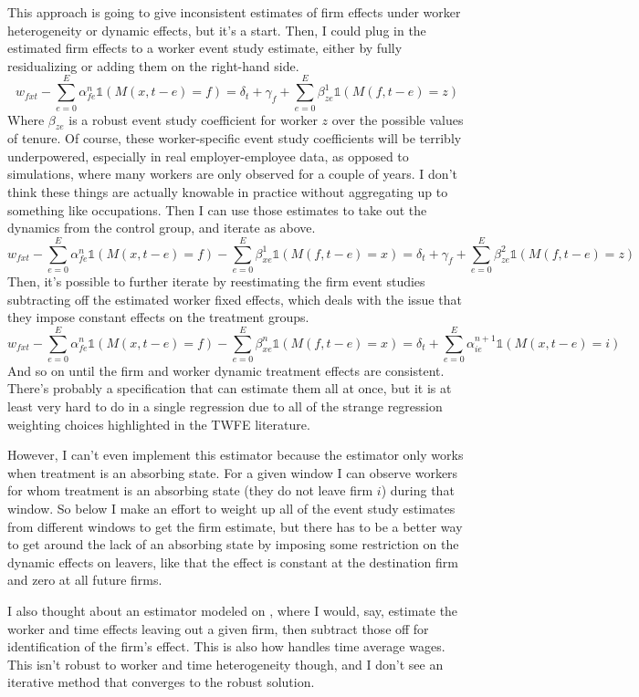 \documentclass{article}
\begin{document}
This approach is going to give inconsistent estimates of firm effects under worker heterogeneity or dynamic effects, but it's a start. Then, I could plug in the estimated firm effects to a worker event study estimate, either by fully residualizing or adding them on the right-hand side.
$$w_{fxt} - \sum_{e=0}^E \alpha^n_{fe} \mathbb{1} (M(x,t-e) = f) = \delta_t + \gamma_f + \sum_{e=0}^E \beta^1_{ze} \mathbb{1} (M(f,t-e) = z)$$
Where $\beta_{ze}$ is a robust event study coefficient for worker $z$ over the possible values of tenure. Of course, these worker-specific event study coefficients will be terribly underpowered, especially in real employer-employee data, as opposed to simulations, where many workers are only observed for a couple of years. I don't think these things are actually knowable in practice without aggregating up to something like occupations. Then I can use those estimates to take out the dynamics from the control group, and iterate as above.
$$w_{fxt} - \sum_{e=0}^E \alpha^n_{fe} \mathbb{1} (M(x,t-e) = f) - \sum_{e=0}^E \beta^1_{xe} \mathbb{1} (M(f,t-e) = x) = \delta_t + \gamma_f + \sum_{e=0}^E \beta^2_{ze} \mathbb{1} (M(f,t-e) = z)$$
Then, it's possible to further iterate by reestimating the firm event studies subtracting off the estimated worker fixed effects, which deals with the issue that they impose constant effects on the treatment groups.
$$w_{fxt} - \sum_{e=0}^E \alpha^n_{fe} \mathbb{1} (M(x,t-e) = f) - \sum_{e=0}^E \beta^n_{xe} \mathbb{1} (M(f,t-e) = x) = \delta_t + \sum_{e=0}^E \alpha^{n+1}_{ie} \mathbb{1} (M(x,t-e) = i)$$
And so on until the firm and worker dynamic treatment effects are consistent. There's probably a specification that can estimate them all at once, but it is at least very hard to do in a single regression due to all of the strange regression weighting choices highlighted in the TWFE literature.

However, I can't even implement this estimator because the \citet{sun2021estimating} estimator only works when treatment is an absorbing state. For a given window I can observe workers for whom treatment is an absorbing state (they do not leave firm $i$) during that window. So below I make an effort to weight up all of the event study estimates from different windows to get the firm estimate, but there has to be a better way to get around the lack of an absorbing state by imposing some restriction on the dynamic effects on leavers, like that the effect is constant at the destination firm and zero at all future firms.

I also thought about an estimator modeled on \citet{gardner2021two}, where I would, say, estimate the worker and time effects leaving out a given firm, then subtract those off for identification of the firm's effect. This is also how \citet{woodcock2015match} handles time average wages. This isn't robust to worker and time heterogeneity though, and I don't see an iterative method that converges to the robust solution.
\end{document}
